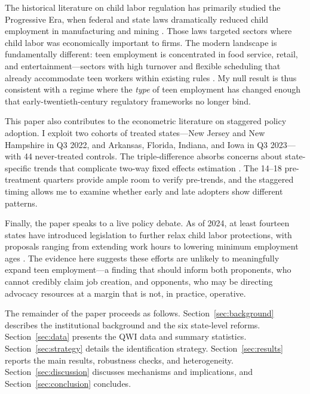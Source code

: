 \documentclass[12pt]{article}
\begin{document}
The historical literature on child labor regulation has primarily studied the Progressive Era, when federal and state laws dramatically reduced child employment in manufacturing and mining \citep{moehling1999women, manacorda2006child, lleras2010children, hindman2002child}. Those laws targeted sectors where child labor was economically important to firms. The modern landscape is fundamentally different: teen employment is concentrated in food service, retail, and entertainment---sectors with high turnover and flexible scheduling that already accommodate teen workers within existing rules \citep{staff2004consequences}. My null result is thus consistent with a regime where the \textit{type} of teen employment has changed enough that early-twentieth-century regulatory frameworks no longer bind.

This paper also contributes to the econometric literature on staggered policy adoption. I exploit two cohorts of treated states---New Jersey and New Hampshire in Q3 2022, and Arkansas, Florida, Indiana, and Iowa in Q3 2023---with 44 never-treated controls. The triple-difference absorbs concerns about state-specific trends that complicate two-way fixed effects estimation \citep{goodmanBacon2021, roth2023pretrends, borusyak2024revisiting}. The 14--18 pre-treatment quarters provide ample room to verify pre-trends, and the staggered timing allows me to examine whether early and late adopters show different patterns.

Finally, the paper speaks to a live policy debate. As of 2024, at least fourteen states have introduced legislation to further relax child labor protections, with proposals ranging from extending work hours to lowering minimum employment ages \citep{DOL2024childlabor}. The evidence here suggests these efforts are unlikely to meaningfully expand teen employment---a finding that should inform both proponents, who cannot credibly claim job creation, and opponents, who may be directing advocacy resources at a margin that is not, in practice, operative.

The remainder of the paper proceeds as follows. Section~\ref{sec:background} describes the institutional background and the six state-level reforms. Section~\ref{sec:data} presents the QWI data and summary statistics. Section~\ref{sec:strategy} details the identification strategy. Section~\ref{sec:results} reports the main results, robustness checks, and heterogeneity. Section~\ref{sec:discussion} discusses mechanisms and implications, and Section~\ref{sec:conclusion} concludes.
\end{document}
